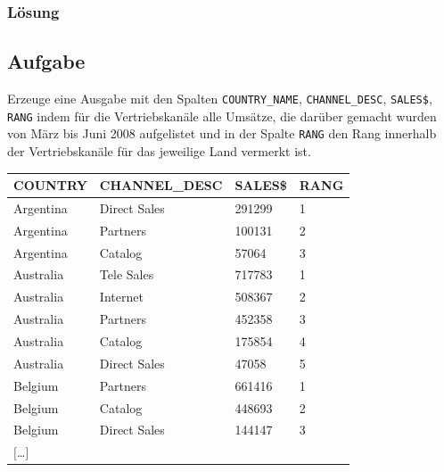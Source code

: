 \subsubsection*{Lösung}
\label{sec:uebung_07.aufgabe_04.loesung}


\subsection{Aufgabe}
\label{sec:uebung_07.aufgabe_05}
Erzeuge eine Ausgabe mit den Spalten \texttt{COUNTRY\_NAME}, \texttt{CHANNEL\_DESC}, \texttt{SALES\$}, \texttt{RANG} indem für die Vertriebskanäle alle Umsätze, die darüber gemacht wurden von März bis Juni 2008 aufgelistet und in der Spalte \texttt{RANG} den Rang innerhalb der Vertriebskanäle für das jeweilige Land vermerkt ist.

\begin{table}[H]
  \centering
  \ttfamily
  \begin{tabular}{|l|l|l|l|}
    \hline
    \textbf{COUNTRY} & \textbf{CHANNEL\_DESC} & \textbf{SALES\$} & \textbf{RANG}  \\
    \hline
    Argentina        & Direct Sales           & 291299           & 1              \\
    Argentina        & Partners               & 100131           & 2              \\
    Argentina        & Catalog                & 57064            & 3              \\
    Australia        & Tele Sales             & 717783           & 1              \\
    Australia        & Internet               & 508367           & 2              \\
    Australia        & Partners               & 452358           & 3              \\
    Australia        & Catalog                & 175854           & 4              \\
    Australia        & Direct Sales           & 47058            & 5              \\
    Belgium          & Partners               & 661416           & 1              \\
    Belgium          & Catalog                & 448693           & 2              \\
    Belgium          & Direct Sales           & 144147           & 3              \\
    $[$\dots$]$      &                        &                  &                \\
    \hline
  \end{tabular}
\end{table}

